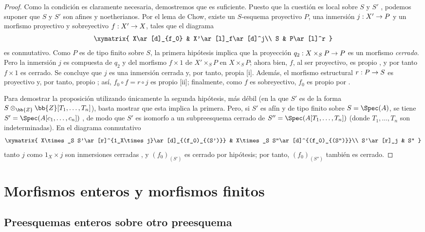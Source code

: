 \documentclass[oneside,10pt]{amsart}
\makeatletter
\newcommand{\ega@arrow}[2]{\mathchoice{#1}{#2}{#2}{#2}}
\renewcommand{\to}{\ega@arrow{\longrightarrow}{\rightarrow}}
\newcommand{\oldpage}[2][]{\marginnote{\normalfont\footnotesize\textbf{#1}~|~#2}\ignorespaces}
\let\EGAOriginalLabel\label
\renewcommand{\label}[1]{\phantomsection\EGAOriginalLabel{#1}}
\makeatother
\begin{document}
\begin{proof}
Como la condición es claramente necesaria, demostremos que es suficiente.
Puesto que la cuestión es local sobre $S$ y $S'$ , podemos suponer que $S$ y $S'$ son afines y noetherianos.
Por el lema de Chow, existe un $S$-esquema proyectivo $P$, una inmersión $j:X'\to P$ y un morfismo proyectivo y sobreyectivo $f:X'\to X$, tales que el diagrama
\[
  \xymatrix{
    X\ar[d]_{f_0} &
    X'\ar[l]_f\ar[d]^j\\
    S &
    P\ar[l]^r
  }
\]
es conmutativo.
Como $P$ es de tipo finito sobre $S$, la primera hipótesis implica que la proyección $q_2:X\times_S P\to P$ es un morfismo \emph{cerrado}.
Pero la inmersión $j$ es compuesta de $q_2$ y del morfismo $f\times1$ de $X'\times_S P$ en $X\times_S P$; ahora bien, $f$, al ser proyectivo, es propio , y por tanto $f\times1$ es cerrado.
Se concluye que $j$ es una inmersión cerrada y, por tanto, propia [i].
Además, el morfismo estructural $r:P\to S$ es proyectivo y, por tanto, propio ; así, $f_0\circ f=r\circ j$ es propio [ii];
finalmente, como $f$ es sobreyectivo, $f_0$ es propio por .

Para demostrar la proposición utilizando únicamente la segunda hipótesis, más débil (en la que $S'$ es de la forma $S\otimes_\bb{Z}\bb{Z}[T_1,\ldots,T_n]$), basta mostrar que esta implica la primera.
Pero, si $S'$ es afín y de tipo finito sobre $S=\Spec(A)$,
\oldpage[II]{110}
se tiene $S'=\Spec(A[c_1,\ldots,c_n])$ , de modo que $S'$ es isomorfo a un subpreesquema cerrado de $S''=\Spec(A[T_1,\ldots,T_n])$ (donde $T_1,\ldots,T_n$ son indeterminadas).
En el diagrama conmutativo
\[
  \xymatrix{
    X\times_S S'\ar[r]^{1_X\times j}\ar[d]_{(f_0)_{(S')}} &
    X\times_S S''\ar[d]^{(f_0)_{(S'')}}\\
    S'\ar[r]_j &
    S''
  }
\]
tanto $j$ como $1_X\times j$ son inmersiones cerradas , y $(f_0)_{(S')}$ es cerrado por hipótesis; por tanto, $(f_0)_{(S'')}$ también es cerrado.
\end{proof}

\section{Morfismos enteros y morfismos finitos}
\label{section:II.6}


\subsection{Preesquemas enteros sobre otro preesquema}
\label{subsection:II.6.1}
\end{document}
